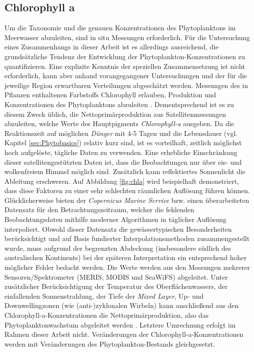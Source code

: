 \documentclass[12pt,a4paper,onecolumn]{scrartcl}
\begin{document}
\subsection{Chlorophyll a} \label{sec:chla}
Um die Taxonomie und die genauen Konzentrationen des Phytoplanktons im Meerwasser abzuleiten, sind in situ Messungen erforderlich. Für die Untersuchung eines Zusammenhangs in dieser Arbeit ist es allerdings ausreichend, die grundsätzliche Tendenz der Entwicklung der Phytoplankton-Konzentrationen zu quantifizieren. Eine explizite Kenntnis der speziellen Zusammensetzung ist nicht erforderlich, kann aber anhand vorangegangener Untersuchungen und der für die jeweilige Region erwartbaren Verteilungen abgeschätzt werden. Messungen des in Pflanzen enthaltenen Farbstoffs Chlorophyll erlauben, Produktion und Konzentrationen des Phytoplanktons abzuleiten \citep{RYTHER.1957}. Dementsprechend ist es zu diesem Zweck üblich, die Nettoprimärproduktion aus Satellitenmessungen abzuleiten, welche Werte des Hauptpigments \textit{Chlorophyll-a} ausgeben. Da die Reaktionszeit auf möglichen \textit{Dünger} mit 4-5 Tagen und die Lebensdauer (vgl. Kapitel \ref{sec:Phytobasics}) relativ kurz sind, ist es vorteilhaft, zeitlich möglichst hoch aufgelöste, tägliche Daten zu verwenden. Eine erhebliche Einschränkung dieser satellitengestützten Daten ist, dass die Beobachtungen nur über eis- und wolkenfreiem Himmel möglich sind. Zusätzlich kann reflektiertes Sonnenlicht die Ableitung erschweren. Auf Abbildung \ref{fig:chla} wird beispielhaft demonstriert, dass diese Faktoren zu einer sehr schlechten räumlichen Auflösung führen können. Glücklicherweise bieten der \textit{Copernicus Marine Service} bzw. \citet{Saulquin.2019} einen überarbeiteten Datensatz für den Betrachtungszeitraum, welcher die fehlenden Beobachtungsdaten mithilfe moderner Algorithmen in täglicher Auflösung interpoliert. Obwohl dieser Datensatz die gewässertypischen Besonderheiten berücksichtigt und auf Basis fundierter Interpolationsmethoden zusammengestellt wurde, muss aufgrund der begrenzten Abdeckung (insbesondere südlich des australischen Kontinents) bei der späteren Interpretation ein entsprechend hoher möglicher Fehler bedacht werden. Die Werte werden aus den Messungen mehrerer Sensoren/Spektrometer (MERIS, MODIS und SeaWiFS) abgeleitet. Unter zusätzlicher Berücksichtigung der Temperatur des Oberflächenwassers, der einfallenden Sonnenstrahlung, der Tiefe der \textit{Mixed Layer}, Up- und Downwellingzonen (wie (anti-)zyklonalen Wirbeln) kann anschließend aus den Chlorophyll-a-Konzentrationen die Nettoprimärproduktion, also das Phytoplanktonwachstum abgeleitet werden \citep{Falkowski.1998}. Letztere Umrechnung erfolgt im Rahmen dieser Arbeit nicht. Veränderungen der Chlorophyll-a-Konzentrationen werden mit Veränderungen des Phytoplankton-Bestands gleichgesetzt.
\end{document}
